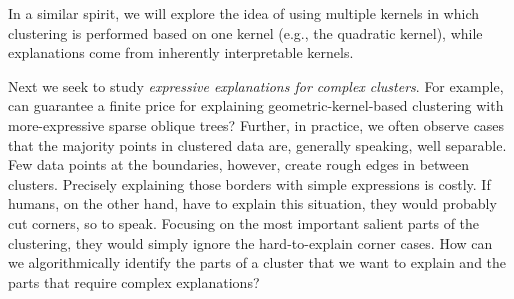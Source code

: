 \documentclass[a4paper,11pt]{article}
\begin{document}


\iffalse


In a similar spirit, we will explore the idea of using multiple kernels 
in which clustering is performed based on one kernel (e.g., the quadratic kernel), 
while explanations come from inherently interpretable kernels.

Next we seek to study \emph{expressive explanations for complex clusters}.
For example, can guarantee a finite price for explaining geometric-kernel-based clustering with more-expressive sparse oblique trees?
Further, in practice, we often observe cases that the majority points in clustered data are, generally speaking, well separable.
Few data points at the boundaries, however, create rough edges in between clusters.
Precisely explaining those borders with simple expressions is costly.
If humans, on the other hand, have to explain this situation, they would probably cut corners, so to speak.
Focusing on the most important salient parts of the clustering, they would simply ignore the hard-to-explain corner cases.
How can we algorithmically identify the parts of a cluster that we want to explain and the parts that require complex explanations?
\end{document}
